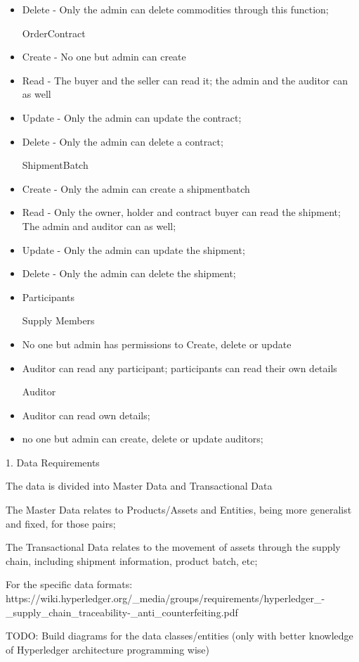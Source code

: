 \begin{itemize}
			\item Delete - Only the admin can delete commodities through this function;
		\par OrderContract
			\item Create - No one but admin can create
			\item Read - The buyer and the seller can read it; the admin and the auditor can as well
			\item Update - Only the admin can update the contract;
			\item Delete - Only the admin can delete a contract;
		\par ShipmentBatch
			\item Create - Only the admin can create a shipmentbatch
			\item Read - Only the owner, holder and contract buyer can read the shipment; The admin and auditor can as well;
			\item Update - Only the admin can update the shipment;
			\item Delete - Only the admin can delete the shipment;
	\item Participants
		\par Supply Members
			\item No one but admin has permissions to Create, delete or update
			\item Auditor can read any participant; participants can read their own details
		\par Auditor
			\item Auditor can read own details; 
			\item no one but admin can create, delete or update auditors;
\end{itemize}	

	1. Data Requirements
		\par The data is divided into Master Data and Transactional Data
		\par The Master Data relates to Products/Assets and Entities, being more generalist and fixed, for those pairs;
		\par The Transactional Data relates to the movement of assets through the supply chain, including shipment information, product batch, etc;
		\par For the specific data formats: https://wiki.hyperledger.org/\_media/groups/requirements/hyperledger\_-\_supply\_chain\_traceability-\_anti\_counterfeiting.pdf
		\par TODO: Build diagrams for the data classes/entities (only with better knowledge of Hyperledger architecture programming wise)
		
